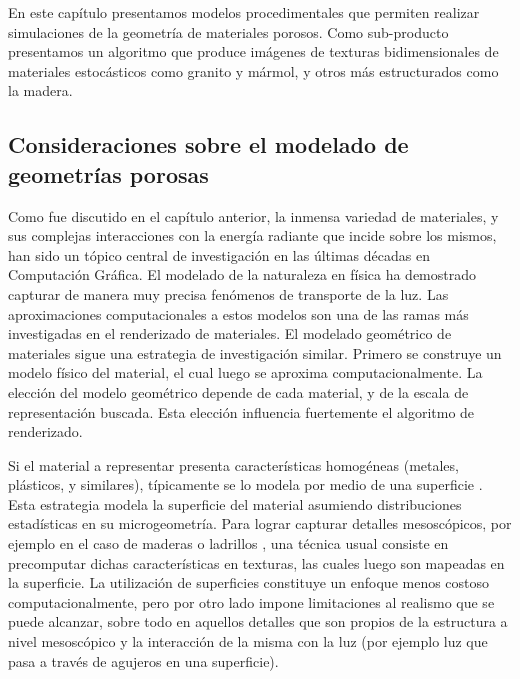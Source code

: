 En este capítulo presentamos modelos procedimentales que permiten realizar simulaciones de la geometría de materiales porosos.
Como sub-producto presentamos un algoritmo que produce imágenes de texturas bidimensionales de materiales estocásticos como granito y mármol, y otros más estructurados como la madera.

\subsection{Consideraciones sobre el modelado de geometrías porosas}
Como fue discutido en el capítulo anterior, la inmensa variedad de materiales, y sus complejas interacciones con la energía radiante que incide sobre los mismos, han sido un tópico central de investigación en las últimas décadas en Computación Gráfica.
El modelado de la naturaleza en física ha demostrado capturar de manera muy precisa fenómenos de transporte de la luz.
Las aproximaciones computacionales a estos modelos son una de las ramas más investigadas en el renderizado de materiales.
El modelado geométrico de materiales sigue una estrategia de investigación similar. Primero se construye un modelo físico del material, el cual luego se aproxima computacionalmente.
La elección del modelo geométrico depende de cada material, y de la escala de representación buscada.
Esta elección influencia fuertemente el algoritmo de renderizado. 


Si el material a representar presenta características homogéneas (metales, plásticos, y similares), típicamente se lo modela por medio de una superficie \cite{Neumann1999}.
Esta estrategia modela la superficie del material asumiendo distribuciones estadísticas en su microgeometría.
Para lograr capturar detalles mesoscópicos, por ejemplo en el caso de maderas o ladrillos \cite{Lefebvre2000}, una técnica usual consiste en precomputar dichas características en texturas, las cuales luego son mapeadas en la superficie.
La utilización de superficies constituye un enfoque menos costoso computacionalmente, pero por otro lado impone limitaciones al realismo que se puede alcanzar, sobre todo en aquellos detalles que son propios de la estructura a nivel mesoscópico y la interacción de la misma con la luz (por ejemplo luz que pasa a través de agujeros en una superficie).

